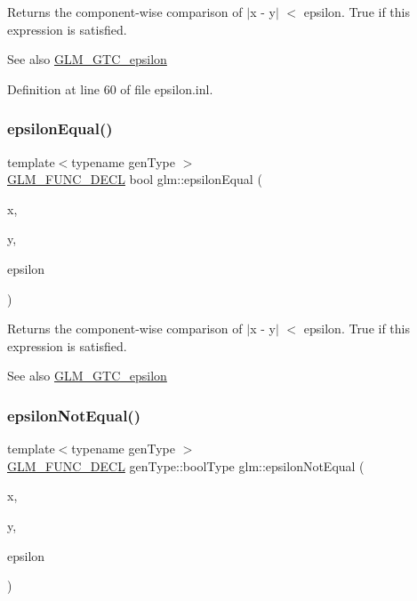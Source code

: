 Returns the component-\/wise comparison of $\vert$x -\/ y$\vert$ $<$ epsilon. True if this expression is satisfied.

\begin{DoxySeeAlso}{See also}
\mbox{\hyperlink{group__gtc__epsilon}{G\+L\+M\+\_\+\+G\+T\+C\+\_\+epsilon}} 
\end{DoxySeeAlso}


Definition at line 60 of file epsilon.\+inl.

\mbox{\label{group__gtc__epsilon_gaa7f227999ca09e7ca994e8b35aba47bb}} 
\subsubsection{\texorpdfstring{epsilonEqual()}{epsilonEqual()}\hspace{0.1cm}{\footnotesize\ttfamily [2/2]}}
{\footnotesize\ttfamily template$<$typename gen\+Type $>$ \\
\mbox{\hyperlink{setup_8hpp_ab2d052de21a70539923e9bcbf6e83a51}{G\+L\+M\+\_\+\+F\+U\+N\+C\+\_\+\+D\+E\+CL}} bool glm\+::epsilon\+Equal (\begin{DoxyParamCaption}\item[{gen\+Type const \&}]{x,  }\item[{gen\+Type const \&}]{y,  }\item[{gen\+Type const \&}]{epsilon }\end{DoxyParamCaption})}

Returns the component-\/wise comparison of $\vert$x -\/ y$\vert$ $<$ epsilon. True if this expression is satisfied.

\begin{DoxySeeAlso}{See also}
\mbox{\hyperlink{group__gtc__epsilon}{G\+L\+M\+\_\+\+G\+T\+C\+\_\+epsilon}} 
\end{DoxySeeAlso}
\mbox{\label{group__gtc__epsilon_ga14e2888a304654ade8a3996024e2739c}} 
\subsubsection{\texorpdfstring{epsilonNotEqual()}{epsilonNotEqual()}\hspace{0.1cm}{\footnotesize\ttfamily [1/2]}}
{\footnotesize\ttfamily template$<$typename gen\+Type $>$ \\
\mbox{\hyperlink{setup_8hpp_ab2d052de21a70539923e9bcbf6e83a51}{G\+L\+M\+\_\+\+F\+U\+N\+C\+\_\+\+D\+E\+CL}} gen\+Type\+::bool\+Type glm\+::epsilon\+Not\+Equal (\begin{DoxyParamCaption}\item[{gen\+Type const \&}]{x,  }\item[{gen\+Type const \&}]{y,  }\item[{typename gen\+Type\+::value\+\_\+type const \&}]{epsilon }\end{DoxyParamCaption})}


